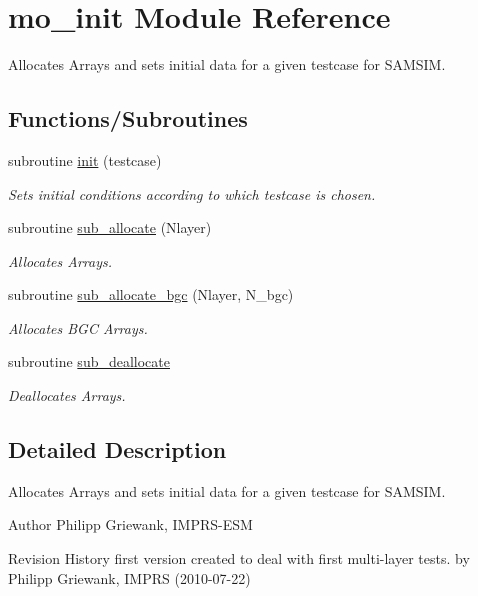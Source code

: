 \hypertarget{namespacemo__init}{
\section{mo\_\-init Module Reference}
\label{namespacemo__init}
}


Allocates Arrays and sets initial data for a given testcase for SAMSIM.  


\subsection*{Functions/Subroutines}
\begin{DoxyCompactItemize}
\item 
subroutine \hyperlink{namespacemo__init_a32008745ff66791f91f74cd2f381f35f}{init} (testcase)
\begin{DoxyCompactList}\small\item\em Sets initial conditions according to which testcase is chosen. \item\end{DoxyCompactList}\item 
subroutine \hyperlink{namespacemo__init_a15907af975b8c0b390a260fba411f17d}{sub\_\-allocate} (Nlayer)
\begin{DoxyCompactList}\small\item\em Allocates Arrays. \item\end{DoxyCompactList}\item 
subroutine \hyperlink{namespacemo__init_a15996dd79eec9299b5aa0cb64a1e05ad}{sub\_\-allocate\_\-bgc} (Nlayer, N\_\-bgc)
\begin{DoxyCompactList}\small\item\em Allocates BGC Arrays. \item\end{DoxyCompactList}\item 
subroutine \hyperlink{namespacemo__init_acd486abfb3ef8b3a6a773d0c9c4b5698}{sub\_\-deallocate}
\begin{DoxyCompactList}\small\item\em Deallocates Arrays. \item\end{DoxyCompactList}\end{DoxyCompactItemize}


\subsection{Detailed Description}
Allocates Arrays and sets initial data for a given testcase for SAMSIM. \begin{DoxyAuthor}{Author}
Philipp Griewank, IMPRS-\/ESM
\end{DoxyAuthor}
\begin{DoxyParagraph}{Revision History}
first version created to deal with first multi-\/layer tests. by Philipp Griewank, IMPRS (2010-\/07-\/22) 
\end{DoxyParagraph}


